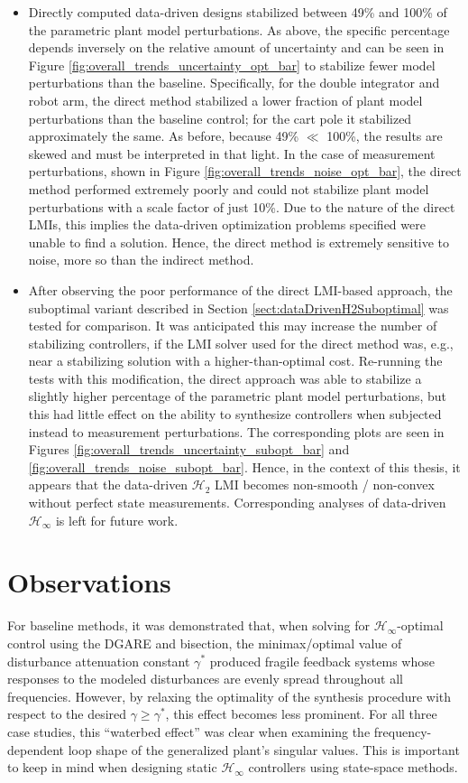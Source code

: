 \begin{itemize}
\item{Directly computed data-driven designs stabilized between 49\% and 100\% of the parametric plant model perturbations.  As above, the specific percentage depends inversely on the relative amount of uncertainty and can be seen in Figure \ref{fig:overall_trends_uncertainty_opt_bar} to stabilize fewer model perturbations than the baseline.  Specifically, for the double integrator and robot arm, the direct method stabilized a lower fraction of plant model perturbations than the baseline control; for the cart pole it stabilized approximately the same.  As before, because 49\% $\ll$ 100\%, the results are skewed and must be interpreted in that light.  In the case of measurement perturbations, shown in Figure \ref{fig:overall_trends_noise_opt_bar}, the direct method performed extremely poorly and could not stabilize plant model perturbations with a scale factor of just 10\%.  Due to the nature of the direct LMIs, this implies the data-driven optimization problems specified were unable to find a solution.  Hence, the direct method is extremely sensitive to noise, more so than the indirect method.
}
%
\item{After observing the poor performance of the direct LMI-based approach, the suboptimal variant described in Section \ref{sect:dataDrivenH2Suboptimal} was tested for comparison.  It was anticipated this may increase the number of stabilizing controllers, if the LMI solver used for the direct method was, e.g., near a stabilizing solution with a higher-than-optimal cost.  Re-running the tests with this modification, the direct approach was able to stabilize a slightly higher percentage of the parametric plant model perturbations, but this had little effect on the ability to synthesize controllers when subjected instead to measurement perturbations.  The corresponding plots are seen in Figures \ref{fig:overall_trends_uncertainty_subopt_bar} and \ref{fig:overall_trends_noise_subopt_bar}.  Hence, in the context of this thesis, it appears that the data-driven $\mathcal{H}_{2}$ LMI becomes non-smooth / non-convex without perfect state measurements.  Corresponding analyses of data-driven $\mathcal{H}_{\infty}$ is left for future work.}
\end{itemize}

\section{Observations}
For baseline methods, it was demonstrated that, when solving for $\mathcal{H}_{\infty}$-optimal control using the DGARE and bisection, the minimax/optimal value of disturbance attenuation constant $\gamma^{*}$ produced fragile feedback systems whose responses to the modeled disturbances are evenly spread throughout all frequencies.  However, by relaxing the optimality of the synthesis procedure with respect to the desired $\gamma \geq \gamma^{*}$, this effect becomes less prominent.  For all three case studies, this ``waterbed effect'' was clear when examining the frequency-dependent loop shape of the generalized plant's singular values.  This is important to keep in mind when designing static $\mathcal{H}_{\infty}$ controllers using state-space methods.


